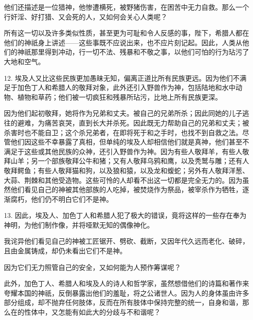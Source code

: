 他们还描述是一位猎神，他惨遭横死，被野猪伤害，在困苦中无力自救。那么一个行奸淫、好打猎、又会死的人，又如何会关心人类呢？\par

所有这一切以及许多类似性质，甚至更为可耻和令人反感的事，陛下，希腊人都在他们的神祇身上讲述——这些事既不应说出来，也不应片刻记起。因此，人类从他们的神祇那里得到冲动，行一切不法、残暴和不敬之事，以他们可怕的行为玷污了大地和空气。\par

12. 埃及人又比这些民族更加愚昧无知，偏离正道比所有民族更远。因为他们不满足于加色丁人和希腊人的敬拜对象，此外还引入野兽作为神，包括陆地和水中动物、植物和草药；他们被一切疯狂和残暴所玷污，比地上所有民族更深。\par

因为他们起初敬拜，她将作为兄弟和丈夫。被自己的兄弟所杀；因此同她的儿子逃往的避难，为痛苦哀哭，直到长大并杀死。因此既无力帮助自己的兄弟和丈夫；被杀害时也不能自卫；这个杀兄弟者，在即将死于和之手时，也找不到自救之法。尽管他们因这些不幸暴露了真相，但单纯的埃及人却相信他们就是真神，他们甚至不满足于这些或其他民族的众神，还引入野兽作为神。因为有些人敬拜羊，有些人敬拜山羊；另一个部族敬拜公牛和猪；又有人敬拜乌鸦和鹰，以及秃鹫与雕；还有人敬拜鳄鱼；有些人敬拜猫和狗，以及狼和猿，以及龙和蝮蛇；另外有人敬拜洋葱、大蒜、荆棘和其他受造物。这些可怜的人却看不出这一切都是完全无力的。因为虽然他们看见自己的神被其他部族的人吃掉，被焚烧作为祭品，被宰杀作为牺牲，逐渐腐朽，他们仍不明白它们不是神。\par

13. 因此，埃及人、加色丁人和希腊人犯了极大的错误，竟将这样的一些存在奉为神明，为他们制作像，并将哑默无知的偶像神化。\par

我诧异他们看见自己的神被工匠锯开、劈砍、截断，又因年代久远而老化、破碎，且由金属铸成，却仍未看出它们不是神。\par

因为它们无力照管自己的安全，又如何能为人预作筹谋呢？\par

此外，加色丁人、希腊人和埃及人的诗人和哲学家，虽然想借他们的诗篇和著作来夸耀本国的神祇，反倒暴露出他们的羞耻，将之公诸世人。因为人的身体虽由许多部分组成，却不抛弃任何肢体，反而在所有肢体中保持完整的统一，自身和谐，那么在的性体中，又怎能有如此大的分歧与不和谐呢？\par

